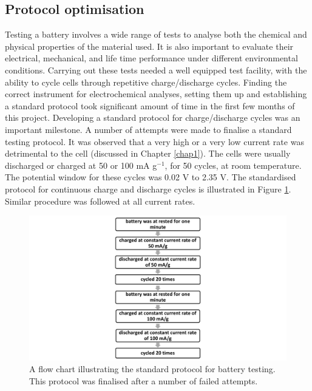 \subsection*{Protocol optimisation}
Testing a battery involves a wide range of tests to analyse both the chemical and physical properties of the material used. It is also important to evaluate their electrical, mechanical, and life time performance under different environmental conditions.
Carrying out these tests needed a well equipped test facility, with the ability to cycle cells through repetitive charge/discharge cycles. Finding the correct instrument for electrochemical analyses, setting them up and establishing a standard protocol took significant amount of time in the first few months of this project. Developing a standard protocol for charge/discharge cycles was an important milestone. A number of attempts were made to finalise a standard testing protocol. It was observed that a very high or a very low current rate was detrimental to the cell (discussed in Chapter \ref{chap1}). The cells were usually discharged or charged at 50 or 100 mA g$^{-1}$, for 50 cycles, at room temperature. The potential window for these cycles was 0.02 V to 2.35 V. The standardised protocol for continuous charge and discharge cycles is illustrated in Figure \ref{Figures/chap3fig:flow}. Similar procedure was followed at all current rates.\\

\begin{figure}[tbh!]
\centering
\includegraphics[width=\textwidth]{Figures/chap3fig/flow.pdf}
\caption{A flow chart illustrating the standard protocol for battery testing. This protocol was finalised after a number of failed attempts.}
\label{Figures/chap3fig:flow}
\end{figure}

